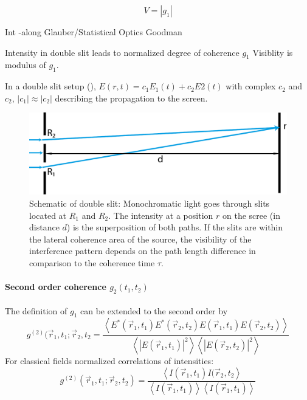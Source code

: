 \begin{equation}
V=\left|g_1\right|
\end{equation}

Int
-along Glauber/Statistical Optics Goodman



Intensity in double slit leads to normalized degree of coherence $g_1$
Visiblity is modulus of $g_1$.

In a double slit setup (), $E(r,t)=c_1 E_1(t)+c_2E2(t)$ with complex $c_2$ and $c_2$, $\left|c_1\right|\approx\left|c_2\right|$ describing the propagation to the screen. 

\begin{figure}
	\centering
	\includegraphics[width=0.8\linewidth]{images/doubleslit.pdf}
	\caption[Schematic of double slit]{Schematic of double slit: Monochromatic light goes through slits located at $R_1$ and $R_2$. The intensity at a position $r$ on the scree (in distance $d$) is the superposition of both paths.  If the slits are within the lateral coherence area of the source, the visibility of the interference pattern depends on the path length difference in comparison to the coherence time $\tau$.}
	\label{fig:doubleslit}
\end{figure}


\paragraph{Second order coherence $g_2(t_1,t_2)$}
The definition of $g_1$ can be extended to the second order by
\begin{equation*}
	g^{(2)}(\vec{r}_1,t_1;\vec{r}_2,t_2= 
	\frac{\left< E^*(\vec{r}_1,t_1)E^*(\vec{r}_2,t_2)E(\vec{r}_1,t_1)E(\vec{r}_2,t_2) \right>}{\left<\left | E(\vec{r}_1,t_1)\right |^2 \right> \left< \left |E(\vec{r}_2,t_2)\right |^2 \right>}	
\end{equation*}
For classical fields normalized correlations of intensities:
\begin{equation}
	g^{(2)}(\vec{r}_1,t_1;\vec{r}_2,t_2)= 
		\frac{\left< I(\vec{r}_1,t_1)I(\vec{r}_2,t_2 \right>}{\left<I(\vec{r}_1,t_1)\right>\left<I(\vec{r}_1,t_1)\right>}	
\end{equation}

